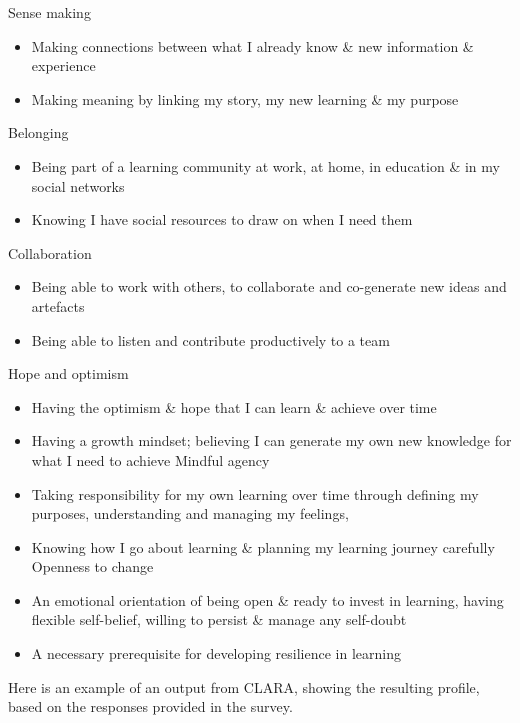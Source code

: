 \documentclass[]{book}
\providecommand{\tightlist}{%
  \setlength{\itemsep}{0pt}\setlength{\parskip}{0pt}}
\theoremstyle{definition}
\theoremstyle{definition}
\theoremstyle{remark}
\begin{document}
Sense making

\begin{itemize}
\tightlist
\item
  Making connections between what I already know \& new information \&
  experience
\item
  Making meaning by linking my story, my new learning \& my purpose
\end{itemize}

Belonging

\begin{itemize}
\tightlist
\item
  Being part of a learning community at work, at home, in education \&
  in my social networks
\item
  Knowing I have social resources to draw on when I need them
\end{itemize}

Collaboration

\begin{itemize}
\tightlist
\item
  Being able to work with others, to collaborate and co-generate new
  ideas and artefacts
\item
  Being able to listen and contribute productively to a team
\end{itemize}

Hope and optimism

\begin{itemize}
\tightlist
\item
  Having the optimism \& hope that I can learn \& achieve over time
\item
  Having a growth mindset; believing I can generate my own new knowledge
  for what I need to achieve Mindful agency
\item
  Taking responsibility for my own learning over time through defining
  my purposes, understanding and managing my feelings,
\item
  Knowing how I go about learning \& planning my learning journey
  carefully Openness to change
\item
  An emotional orientation of being open \& ready to invest in learning,
  having flexible self-belief, willing to persist \& manage any
  self-doubt
\item
  A necessary prerequisite for developing resilience in learning
\end{itemize}

Here is an example of an output from CLARA, showing the resulting
profile, based on the responses provided in the survey.
\end{document}
